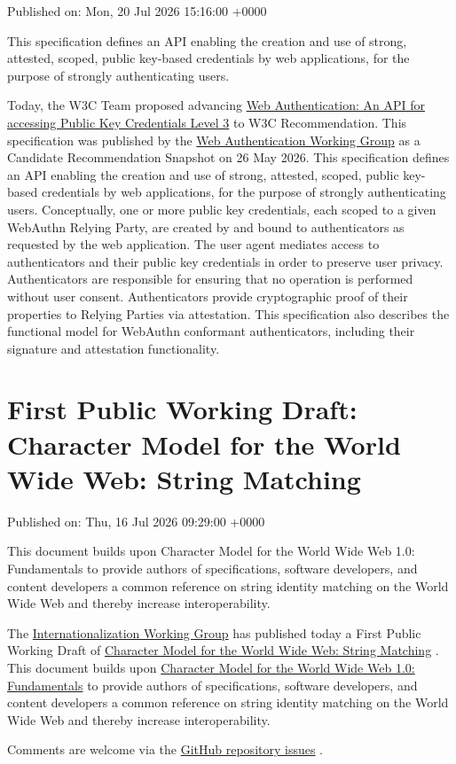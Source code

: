 \documentclass[11pt,a4paper]{article}
\begin{document}
Published on: Mon, 20 Jul 2026 15:16:00 +0000

This specification defines an API enabling the creation and use of strong, attested, scoped, public key-based credentials by web applications, for the purpose of strongly authenticating users.

Today, the W3C Team proposed advancing \href{https://www.w3.org/TR/2026/CR-webauthn-3-20260526/}{Web Authentication: An API for accessing Public Key Credentials Level 3} to W3C Recommendation. This specification was published by the \href{https://www.w3.org/groups/wg/webauthn/}{Web Authentication Working Group} as a Candidate Recommendation Snapshot on 26 May 2026. This specification defines an API enabling the creation and use of strong, attested, scoped, public key-based credentials by web applications, for the purpose of strongly authenticating users. Conceptually, one or more public key credentials, each scoped to a given WebAuthn Relying Party, are created by and bound to authenticators as requested by the web application. The user agent mediates access to authenticators and their public key credentials in order to preserve user privacy. Authenticators are responsible for ensuring that no operation is performed without user consent. Authenticators provide cryptographic proof of their properties to Relying Parties via attestation. This specification also describes the functional model for WebAuthn conformant authenticators, including their signature and attestation functionality.

\section{First Public Working Draft: Character Model for the World Wide Web: String Matching}

Published on: Thu, 16 Jul 2026 09:29:00 +0000

This document builds upon Character Model for the World Wide Web 1.0: Fundamentals to provide authors of specifications, software developers, and content developers a common reference on string identity matching on the World Wide Web and thereby increase interoperability.

The \href{https://www.w3.org/groups/wg/i18n-core/}{Internationalization Working Group} has published today a First Public Working Draft of \href{https://www.w3.org/TR/2026/WD-charmod-norm-20260716/}{Character Model for the World Wide Web: String Matching} . This document builds upon \href{https://www.w3.org/TR/charmod/}{Character Model for the World Wide Web 1.0: Fundamentals} to provide authors of specifications, software developers, and content developers a common reference on string identity matching on the World Wide Web and thereby increase interoperability.

Comments are welcome via the \href{https://github.com/w3c/charmod-norm/}{GitHub repository issues} .
\end{document}
